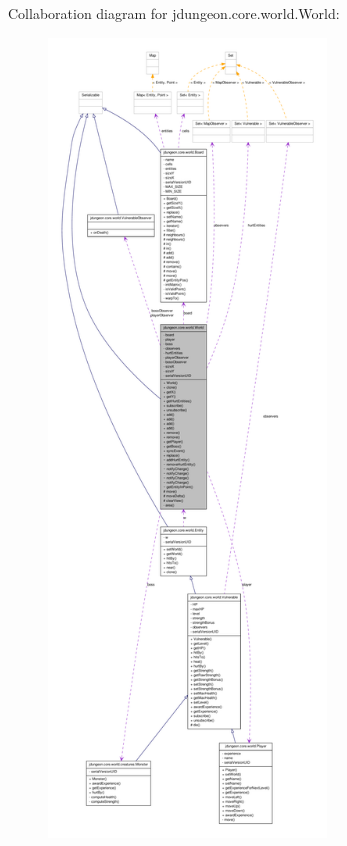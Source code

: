 Collaboration diagram for jdungeon.core.world.World:
\nopagebreak
\begin{figure}[H]
\begin{center}
\leavevmode
\includegraphics[height=600pt]{classjdungeon_1_1core_1_1world_1_1_world__coll__graph}
\end{center}
\end{figure}
